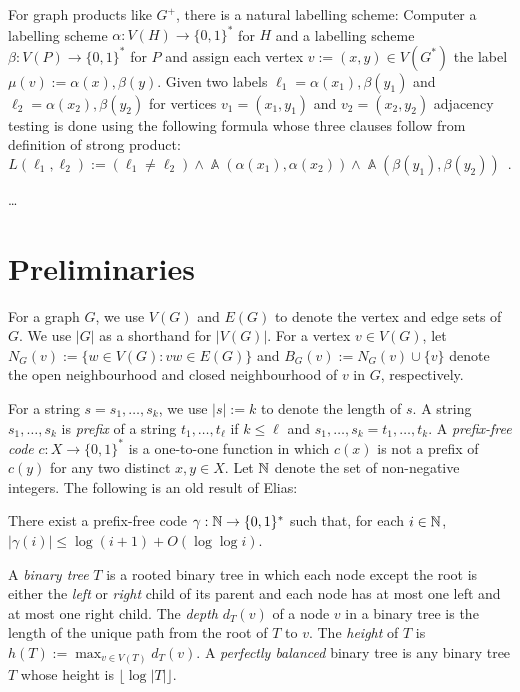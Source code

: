 \documentclass[kpfonts]{patmorin}
\DeclareMathOperator{\A}{\mathds{A}}
\begin{document}
For graph products like $G^+$, there is a natural labelling scheme: Computer a labelling scheme $\alpha:V(H)\to\{0,1\}^*$ for $H$ and a labelling scheme $\beta:V(P)\to\{0,1\}^*$ for $P$ and assign each vertex $v:=(x,y)\in V(G^*)$ the label $\mu(v):=\alpha(x),\beta(y)$.  Given two labels $\ell_1=\alpha(x_1),\beta(y_1)$ and $\ell_2=\alpha(x_2),\beta(y_2)$ for vertices $v_1=(x_1,y_1)$ and $v_2=(x_2,y_2)$ adjacency testing is done using the following formula whose three clauses follow from definition of strong product:
\[
    L(\ell_1,\ell_2):= (\ell_1\neq \ell_2) \wedge \A(\alpha(x_1),\alpha(x_2)) \wedge \A(\beta(y_1),\beta(y_2)) \enspace .
\]

\ldots



\section{Preliminaries}

For a graph $G$, we use $V(G)$ and $E(G)$ to denote the vertex and edge sets of $G$.  We use $|G|$ as a shorthand for $|V(G)|$. For a vertex $v\in V(G)$, let $N_G(v):=\{w\in V(G): vw\in E(G)\}$ and $B_G(v):=N_G(v)\cup\{v\}$ denote the open neighbourhood and closed neighbourhood of $v$ in $G$, respectively.

For a string $s=s_1,\ldots,s_k$, we use $|s|:=k$ to denote the length of $s$. A string $s_1,\ldots,s_k$ is \emph{prefix} of a string $t_1,\ldots,t_\ell$ if $k\le \ell$ and $s_1,\ldots,s_k=t_1,\ldots,t_k$.  A \emph{prefix-free code} $c:X\to\{0,1\}^*$ is a one-to-one function in which $c(x)$ is not a prefix of $c(y)$ for any two distinct $x,y\in X$.  Let $\mathbb{N}$ denote the set of non-negative integers.  The following is an old result of Elias:

\begin{lem}
    There exist a prefix-free code $\gamma:\mathbb{N}\to\{0,1\}^*$ such that, for each $i\in\mathbb{N}$, $|\gamma(i)|\le \log(i+1)+O(\log\log i)$.
\end{lem}

A \emph{binary tree} $T$ is a rooted binary tree in which each node except the root is either the \emph{left} or \emph{right} child of its parent and each node has at most one left and at most one right child.  The \emph{depth} $d_T(v)$ of a node $v$ in a binary tree is the length of the unique path from the root of $T$ to $v$.  The \emph{height} of $T$ is $h(T):=\max_{v\in V(T)} d_T(v)$.  A \emph{perfectly balanced} binary tree is any binary tree $T$ whose height is $\lfloor\log |T|\rfloor$.
\end{document}
